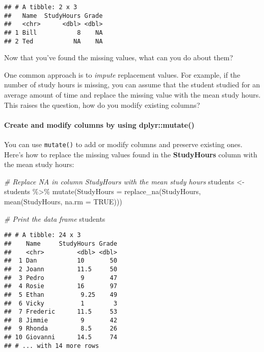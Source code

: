 \documentclass[
]{article}
\newenvironment{Shaded}{\begin{snugshade}}{\end{snugshade}}
\newcommand{\AttributeTok}[1]{\textcolor[rgb]{0.77,0.63,0.00}{#1}}
\newcommand{\CommentTok}[1]{\textcolor[rgb]{0.56,0.35,0.01}{\textit{#1}}}
\newcommand{\ConstantTok}[1]{\textcolor[rgb]{0.00,0.00,0.00}{#1}}
\newcommand{\FunctionTok}[1]{\textcolor[rgb]{0.00,0.00,0.00}{#1}}
\newcommand{\NormalTok}[1]{#1}
\newcommand{\OtherTok}[1]{\textcolor[rgb]{0.56,0.35,0.01}{#1}}
\newcommand{\SpecialCharTok}[1]{\textcolor[rgb]{0.00,0.00,0.00}{#1}}
\begin{document}
\begin{verbatim}
## # A tibble: 2 x 3
##   Name  StudyHours Grade
##   <chr>      <dbl> <dbl>
## 1 Bill           8    NA
## 2 Ted           NA    NA
\end{verbatim}

Now that you've found the missing values, what can you do about them?

One common approach is to \emph{impute} replacement values. For example,
if the number of study hours is missing, you can assume that the student
studied for an average amount of time and replace the missing value with
the mean study hours. This raises the question, how do you modify
existing columns?

\hypertarget{create-and-modify-columns-by-using-dplyrmutate}{%
\paragraph{Create and modify columns by using
dplyr::mutate()}\label{create-and-modify-columns-by-using-dplyrmutate}}

You can use \texttt{mutate()} to add or modify columns and preserve
existing ones. Here's how to replace the missing values found in the
\textbf{StudyHours} column with the mean study hours:

\begin{Shaded}
\begin{Highlighting}[]
\CommentTok{\# Replace NA in column StudyHours with the mean study hours}
\NormalTok{students }\OtherTok{\textless{}{-}}\NormalTok{ students }\SpecialCharTok{\%\textgreater{}\%} 
  \FunctionTok{mutate}\NormalTok{(}\AttributeTok{StudyHours =} \FunctionTok{replace\_na}\NormalTok{(StudyHours, }\FunctionTok{mean}\NormalTok{(StudyHours, }\AttributeTok{na.rm =} \ConstantTok{TRUE}\NormalTok{)))}

\CommentTok{\# Print the data frame}
\NormalTok{students}
\end{Highlighting}
\end{Shaded}

\begin{verbatim}
## # A tibble: 24 x 3
##    Name     StudyHours Grade
##    <chr>         <dbl> <dbl>
##  1 Dan           10       50
##  2 Joann         11.5     50
##  3 Pedro          9       47
##  4 Rosie         16       97
##  5 Ethan          9.25    49
##  6 Vicky          1        3
##  7 Frederic      11.5     53
##  8 Jimmie         9       42
##  9 Rhonda         8.5     26
## 10 Giovanni      14.5     74
## # ... with 14 more rows
\end{verbatim}
\end{document}

